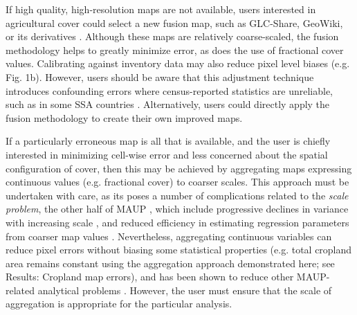 \documentclass[12 pt, titlepage, a4paper]{article}
\begin{document}
If high quality, high-resolution maps are not available, users interested in agricultural cover could select a new fusion map, such as GLC-Share, GeoWiki, or its derivatives \citep{fritz_mapping_2015,waldner_unified_2016}. Although these maps are relatively coarse-scaled, the fusion methodology helps to greatly minimize error, as does the use of fractional cover values. Calibrating against inventory data may also reduce pixel level biases (e.g. Fig. 1b). However, users should be aware that this adjustment technique introduces confounding errors where census-reported statistics are unreliable, such as in some SSA countries \citep{carletto_emperor_2013,carletto_guesstimates_2015}.  Alternatively, users could directly apply the fusion methodology \citep{fritz_cropland_2011} to create their own improved maps. 

If a particularly erroneous map is all that is available, and the user is chiefly interested in minimizing cell-wise error and less concerned about the spatial configuration of cover, then this may be achieved by aggregating maps expressing continuous values (e.g. fractional cover) to coarser scales. This approach must be undertaken with care, as its poses a number of complications related to the \emph{scale problem}, the other half of MAUP \citep{openshaw_million_1979}, which include progressive declines in variance with increasing scale \citep[even if means remain constant;][]{dark_modifiable_2007}, and reduced efficiency in estimating regression parameters from coarser map values \citep[][]{avelino_goldilocks_2016}. Nevertheless, aggregating continuous variables can reduce pixel errors without biasing some statistical properties (e.g. total cropland area remains constant using the aggregation approach demonstrated here; see Results: Cropland map errors), and has been shown to reduce other MAUP-related analytical problems \citep{avelino_goldilocks_2016}. However, the user must ensure that the scale of aggregation is appropriate for the particular analysis.   
\end{document}
